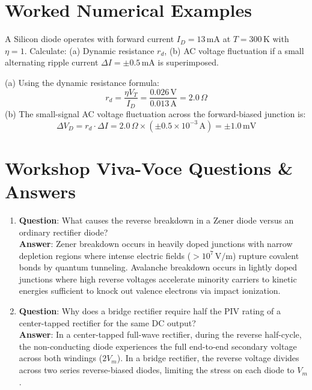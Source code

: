 \section{Worked Numerical Examples}
\begin{example}
A Silicon diode operates with forward current $I_D = 13\,\mathrm{mA}$ at $T = 300\,\mathrm{K}$ with $\eta = 1$. Calculate: (a) Dynamic resistance $r_d$, (b) AC voltage fluctuation if a small alternating ripple current $\Delta I = \pm 0.5\,\mathrm{mA}$ is superimposed.
\end{example}
\begin{solutionbox}
(a) Using the dynamic resistance formula:
\[ r_d = \frac{\eta V_T}{I_D} = \frac{0.026\,\mathrm{V}}{0.013\,\mathrm{A}} = 2.0\,\Omega \]
(b) The small-signal AC voltage fluctuation across the forward-biased junction is:
\[ \Delta V_D = r_d \cdot \Delta I = 2.0\,\Omega \times (\pm 0.5 \times 10^{-3}\,\mathrm{A}) = \pm 1.0\,\mathrm{mV} \]
\end{solutionbox}

\section{Workshop Viva-Voce Questions \& Answers}
\begin{enumerate}[leftmargin=1.5em]
    \item \textbf{Question}: What causes the reverse breakdown in a Zener diode versus an ordinary rectifier diode?\\
    \textbf{Answer}: Zener breakdown occurs in heavily doped junctions with narrow depletion regions where intense electric fields ($> 10^7\,\mathrm{V/m}$) rupture covalent bonds by quantum tunneling. Avalanche breakdown occurs in lightly doped junctions where high reverse voltages accelerate minority carriers to kinetic energies sufficient to knock out valence electrons via impact ionization.
    \item \textbf{Question}: Why does a bridge rectifier require half the PIV rating of a center-tapped rectifier for the same DC output?\\
    \textbf{Answer}: In a center-tapped full-wave rectifier, during the reverse half-cycle, the non-conducting diode experiences the full end-to-end secondary voltage across both windings ($2 V_m$). In a bridge rectifier, the reverse voltage divides across two series reverse-biased diodes, limiting the stress on each diode to $V_m$.
\end{enumerate}
